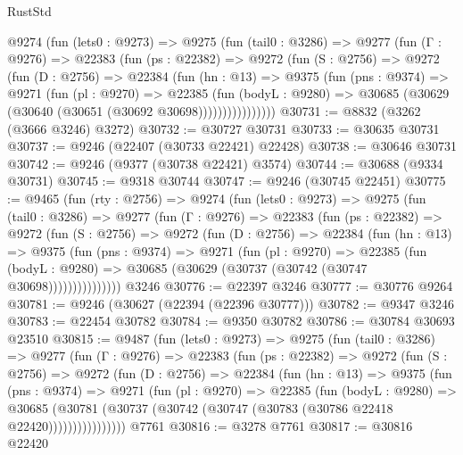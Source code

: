 \begin{lexlean}{RustStd}
\begin{coremodule}
      @9274
        (fun (lets0 : @9273) =>
        @9275
          (fun (tail0 : @3286) =>
          @9277
            (fun (Γ : @9276) =>
            @22383
              (fun (ps : @22382) =>
              @9272
                (fun (S : @2756) =>
                @9272
                  (fun (D : @2756) =>
                  @22384
                    (fun (hn : @13) =>
                    @9375
                      (fun (pns : @9374) =>
                      @9271
                        (fun (pl : @9270) =>
                        @22385
                          (fun (bodyL : @9280) =>
                          @30685 (@30629 (@30640 (@30651 (@30692 @30698))))))))))))))))
@30731 := @8832 (@3262 (@3666 @3246) @3272)
@30732 := @30727 @30731
@30733 := @30635 @30731
@30737 := @9246 (@22407 (@30733 @22421) @22428)
@30738 := @30646 @30731
@30742 := @9246 (@9377 (@30738 @22421) @3574)
@30744 := @30688 (@9334 @30731)
@30745 := @9318 @30744
@30747 := @9246 (@30745 @22451)
@30775 := @9465
    (fun (rty : @2756) =>
    @9274
      (fun (lets0 : @9273) =>
      @9275
        (fun (tail0 : @3286) =>
        @9277
          (fun (Γ : @9276) =>
          @22383
            (fun (ps : @22382) =>
            @9272
              (fun (S : @2756) =>
              @9272
                (fun (D : @2756) =>
                @22384
                  (fun (hn : @13) =>
                  @9375
                    (fun (pns : @9374) =>
                    @9271
                      (fun (pl : @9270) =>
                      @22385
                        (fun (bodyL : @9280) =>
                        @30685 (@30629 (@30737 (@30742 (@30747 @30698)))))))))))))))
    @3246
@30776 := @22397 @3246
@30777 := @30776 @9264
@30781 := @9246 (@30627 (@22394 (@22396 @30777)))
@30782 := @9347 @3246
@30783 := @22454 @30782
@30784 := @9350 @30782
@30786 := @30784 @30693 @23510
@30815 := @9487
    (fun (lets0 : @9273) =>
    @9275
      (fun (tail0 : @3286) =>
      @9277
        (fun (Γ : @9276) =>
        @22383
          (fun (ps : @22382) =>
          @9272
            (fun (S : @2756) =>
            @9272
              (fun (D : @2756) =>
              @22384
                (fun (hn : @13) =>
                @9375
                  (fun (pns : @9374) =>
                  @9271
                    (fun (pl : @9270) =>
                    @22385
                      (fun (bodyL : @9280) =>
                      @30685
                        (@30781
                          (@30737 (@30742 (@30747 (@30783 (@30786 @22418 @22420))))))))))))))))
    @7761
@30816 := @3278 @7761
@30817 := @30816 @22420

\end{coremodule}
\end{lexlean}
